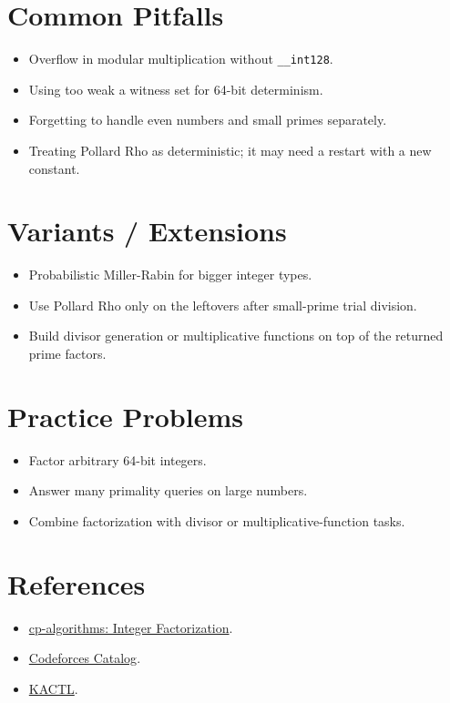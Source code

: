 \section*{Common Pitfalls}

\begin{itemize}
  \item Overflow in modular multiplication without \texttt{\_\_int128}.
  \item Using too weak a witness set for 64-bit determinism.
  \item Forgetting to handle even numbers and small primes separately.
  \item Treating Pollard Rho as deterministic; it may need a restart with a new constant.
\end{itemize}

\section*{Variants / Extensions}

\begin{itemize}
  \item Probabilistic Miller-Rabin for bigger integer types.
  \item Use Pollard Rho only on the leftovers after small-prime trial division.
  \item Build divisor generation or multiplicative functions on top of the returned prime factors.
\end{itemize}

\section*{Practice Problems}

\begin{itemize}
  \item Factor arbitrary 64-bit integers.
  \item Answer many primality queries on large numbers.
  \item Combine factorization with divisor or multiplicative-function tasks.
\end{itemize}

\section*{References}

\begin{itemize}
  \item \href{https://cp-algorithms.com/algebra/factorization.html}{cp-algorithms: Integer Factorization}.
  \item \href{https://codeforces.com/catalog?locale=en}{Codeforces Catalog}.
  \item \href{https://github.com/kth-competitive-programming/kactl}{KACTL}.
\end{itemize}
